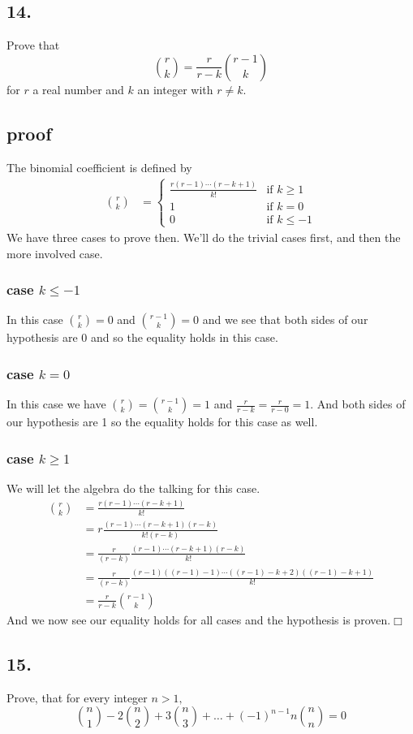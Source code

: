\documentclass{article}
\begin{document}
\subsection*{14.}
Prove that
\[\binom{r}{k}=\frac{r}{r-k}\binom{r-1}{k}\]
for $r$ a real number and $k$ an integer with $r\ne k$.
\subsection*{proof}
The binomial coefficient is defined by
\begin{align*}
  \binom{r}{k}&=
  \begin{cases}
    \frac{r(r-1)\cdots(r-k+1)}{k!}&\text{if }k\ge 1\\
    1&\text{if }k=0\\
    0&\text{if }k\le-1
  \end{cases}
\end{align*}
We have three cases to prove then. We'll do the trivial cases first, and then the more involved case.
\subsubsection*{case $k\le-1$}
In this case $\binom{r}{k}=0$ and $\binom{r-1}{k}=0$ and we see that both sides of our hypothesis are $0$ and so the equality holds in this case.
\subsubsection*{case $k=0$}
In this case we have $\binom{r}{k}=\binom{r-1}{k}=1$ and $\frac{r}{r-k}=\frac{r}{r-0}=1$. And both sides of our hypothesis are 1 so the equality holds for this case as well.
\subsubsection*{case $k\ge1$}
We will let the algebra do the talking for this case.
\begin{align*}
  \binom{r}{k}&=\frac{r(r-1)\cdots(r-k+1)}{k!}\\
  &=r\frac{(r-1)\cdots(r-k+1)(r-k)}{k!(r-k)}\\
  &=\frac{r}{(r-k)}\frac{(r-1)\cdots(r-k+1)(r-k)}{k!}\\
  &=\frac{r}{(r-k)}\frac{(r-1)((r-1)-1)\cdots((r-1)-k+2)((r-1)-k+1)}{k!}\\
  &=\frac{r}{r-k}\binom{r-1}{k}
\end{align*}
And we now see our equality holds for all cases and the hypothesis is proven.$\Box$
\subsection*{15.}
Prove, that for every integer $n>1,$
\[\binom{n}{1}-2\binom{n}{2}+3\binom{n}{3}+\dots+(-1)^{n-1}n\binom{n}{n}=0\]
\end{document}

